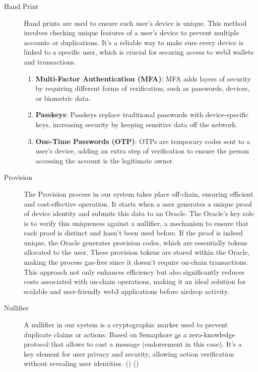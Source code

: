 \documentclass[12pt,oneside]{article}
\begin{document}
\begin{description}
  \item[Hand Print] 
  Hand prints are used to ensure each user's device is unique. This method involves checking unique features of a user's device to prevent multiple accounts or duplications. It's a reliable way to make sure every device is linked to a specific user, which is crucial for securing access to web3 wallets and transactions. 
  
  \begin{enumerate}
      \item \textbf{Multi-Factor Authentication (MFA)}: MFA adds layers of security by requiring different forms of verification, such as passwords, devices, or biometric data.
      \item \textbf{Passkeys}: Passkeys replace traditional passwords with device-specific keys, increasing security by keeping sensitive data off the network.
      \item \textbf{One-Time Passwords (OTP)}: OTPs are temporary codes sent to a user's device, adding an extra step of verification to ensure the person accessing the account is the legitimate owner.
  \end{enumerate}  

  \item[Provision]
  The Provision process in our system takes place off-chain, ensuring
  efficient and cost-effective operation. It starts when a user generates a unique proof of
  device identity and submits this data to an Oracle. The Oracle's key role is to verify this uniqueness 
  against a nullifier, a mechanism to ensure that each proof is distinct and hasn't been used before. 
  If the proof is indeed unique, the Oracle generates provision codes, which are essentially tokens allocated 
  to the user. These provision tokens are stored within the Oracle, making the process gas-free since it doesn't require
  on-chain transactions. This approach not only enhances efficiency but also significantly reduces costs associated with
  on-chain operations, making it an ideal solution for scalable and user-friendly web3 applications before airdrop activity.

  \item[Nullifier]
  A nullifier in our system is a cryptographic marker used to prevent duplicate claims or actions. 
  Based on Semaphore \href{https://semaphore.pse.dev/} as a zero-knowledge protocol that allows to cast a message (endorsement in this case).
  It's a key element for user privacy and security, allowing action verification without revealing 
  user identities. (\cite{semaphore_protocol_github}) (\cite{fazekas2023semaphore})


\end{description}
\end{document}
